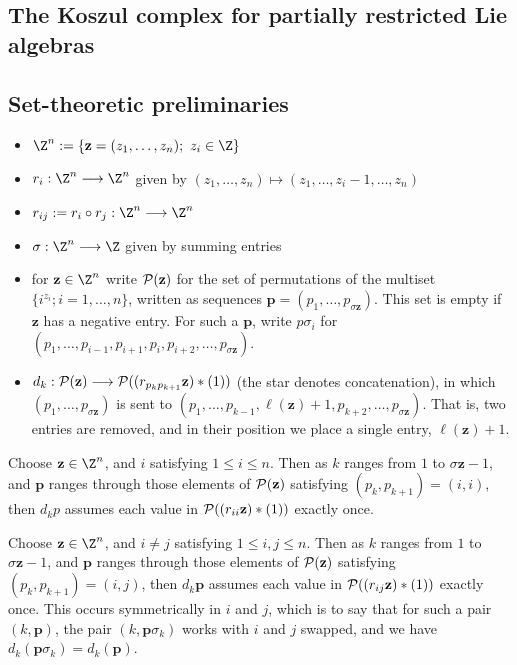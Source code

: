 \documentclass[11pt]{article}
\begin{document}
\begin{PRlieKoszulComplexCalculation}
\section*{The Koszul complex for partially restricted Lie algebras}
\subsection*{Set-theoretic preliminaries}

\begin{itemize}
\setlength{\parindent}{.25in}
\item $\Z^n:=\{\textbf{z}=(z_1,\ldots,z_n);\ z_i\in\Z\}$
\item $r_i:\Z^n\to\Z^n$ given by $(z_1,\ldots,z_n)\mapsto(z_1,\ldots,z_i-1,\ldots,z_n)$
\item $r_{ij}:=r_i\circ r_j:\Z^n\to\Z^n$
\item $\sigma:\Z^n\to\Z$ given by summing entries
\item for $\textbf{z}\in\Z^n$ write $\mathcal{P}(\textbf{z})$ for the set of permutations of the multiset $\{i^{z_i};i=1,\ldots,n\}$, written as sequences $\textbf{p}=(p_1,\ldots,p_{\sigma \textbf{z}})$. This set is empty if $\textbf{z}$ has a negative entry. For such a $\textbf{p}$, write $p\sigma_i$ for $(p_1,\ldots,p_{i-1},p_{i+1},p_{i},p_{i+2},\ldots,p_{\sigma \textbf{z}})$.
\item $d_k:\mathcal{P}(\textbf{z})\longrightarrow\mathcal{P}((r_{p_kp_{k+1}}\textbf{z})*(1))$ (the star denotes concatenation), in which $(p_1,\ldots,p_{\sigma \textbf{z}})$ is sent to $(p_1,\ldots,p_{k-1},\ell(\textbf{z})+1,p_{k+2},\ldots,p_{\sigma \textbf{z}})$. That is, two entries are removed, and in their position we place a single entry, $\ell(\textbf{z})+1$.
\end{itemize}
\begin{prop*}
Choose $\textbf{z}\in\Z^n$, and $i$ satisfying $1\leq i\leq n$. Then as $k$ ranges from $1$ to $\sigma \textbf{z}-1$, and $\textbf{p}$ ranges through those elements of $\mathcal{P}(\textbf{z})$ satisfying $(p_k,p_{k+1})=(i,i)$, then $d_kp$ assumes each value in $\mathcal{P}((r_{ii}\textbf{z})*(1))$ exactly once.
\end{prop*}
\begin{prop*}
Choose $\textbf{z}\in\Z^n$, and $i\neq j$ satisfying $1\leq i,j\leq n$. Then as $k$ ranges from $1$ to $\sigma \textbf{z}-1$, and $\textbf{p}$ ranges through those elements of $\mathcal{P}(\textbf{z})$ satisfying $(p_k,p_{k+1})=(i,j)$, then $d_k\textbf{p}$ assumes each value in $\mathcal{P}((r_{ij}\textbf{z})*(1))$ exactly once. This occurs symmetrically in $i$ and $j$, which is to say that for such a pair $(k,\textbf{p})$, the pair $(k,\textbf{p}\sigma_k)$ works with $i$ and $j$ swapped, and we have $d_k(\textbf{p}\sigma_k)=d_k(\textbf{p})$.
\end{prop*}


\end{PRlieKoszulComplexCalculation}
\end{document}
